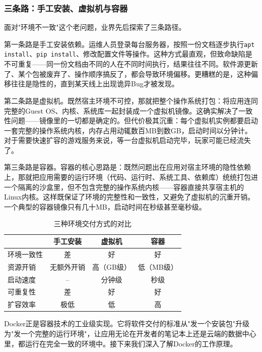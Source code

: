 \subsubsection{三条路：手工安装、虚拟机与容器}

面对"环境不一致"这个老问题，业界先后探索了三条路径。

第一条路是手工安装依赖。运维人员登录每台服务器，按照一份文档逐步执行\texttt{apt install}、\texttt{pip install}、修改配置文件等操作。这种方式最直观，但致命缺陷是不可重复——同一份文档由不同的人在不同时间执行，结果往往不同。软件源更新了、某个包被废弃了、操作顺序搞反了，都会导致环境偏移。更糟糕的是，这种偏移往往是隐性的，直到某天线上出现诡异Bug才被发现。

第二条路是虚拟机。既然宿主环境不可控，那就把整个操作系统打包：将应用连同完整的Guest OS、内核、系统库一起封装成一个虚拟机镜像。这确实解决了一致性问题——镜像里的一切都是确定的。但代价极其沉重：每个虚拟机实例都要启动一套完整的操作系统内核，内存占用动辄数百MB到数GB，启动时间以分钟计。对于需要快速扩容的游戏服务来说，等一台虚拟机启动完毕，玩家可能已经流失了。

第三条路是容器。容器的核心思路是：既然问题出在应用对宿主环境的隐性依赖上，那就把应用需要的运行环境（代码、运行时、系统工具、依赖库）统统打包进一个隔离的沙盒里，但不包含完整的操作系统内核——容器直接共享宿主机的Linux内核。这样既保证了环境的完整性和一致性，又避免了虚拟机的沉重开销。一个典型的容器镜像只有几十MB，启动时间在秒级甚至毫秒级。

\begin{table}[htbp]
\centering
\begin{tabular}{|l|c|c|c|}
\hline
 & 手工安装 & 虚拟机 & 容器 \\
\hline
环境一致性 & 差 & 好 & 好 \\
\hline
资源开销 & 无额外开销 & 高（GB级） & 低（MB级） \\
\hline
启动速度 & -- & 分钟级 & 秒级 \\
\hline
可重复性 & 差 & 好 & 好 \\
\hline
扩容效率 & 极低 & 低 & 高 \\
\hline
\end{tabular}
\caption{三种环境交付方式的对比}
\label{tab:env-delivery-comparison}
\end{table}

Docker正是容器技术的工业级实现。它将软件交付的标准从"发一个安装包"升级为"发一个完整的运行环境"，让应用无论在开发者的笔记本上还是云端的数据中心里，都运行在完全一致的环境中。接下来我们深入了解Docker的工作原理。


